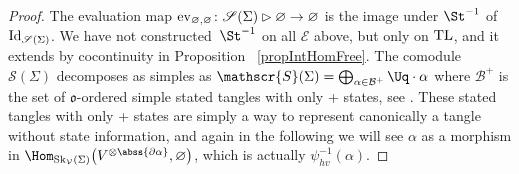 \begin{proof}
The evaluation map ${\rm ev}_{\varnothing,\varnothing}\colon \mathscr{S}(\Sigma)\rhd \varnothing\to\varnothing$ is the image under $\St^{-1}$ of ${\rm Id}_{\mathscr{S}(\Sigma)}$. We have not constructed~$\St^{-1}$ on all $\mathcal{E}$ above, but only on ${\rm TL}$, and it extends by cocontinuity in Proposition~ \ref{propIntHomFree}. The comodule~$\mathscr{S}(\Sigma)$ decomposes as simples as $\mathscr{S}(\Sigma) = \bigoplus_{\alpha \in \mathcal{B}^+} \Uq\cdot \alpha$ where $\mathcal{B}^+$ is the set of $\mathfrak{o}$-ordered simple stated tangles with only + states, see \cite[Theorem~4.6(b)]{Cos}. These stated tangles with only + states are simply a way to represent canonically a tangle without state information, and again in the following we will see $\alpha$ as a morphism in $\Hom_{{\rm Sk}_\mathcal{V}(\Sigma)}\big(V^{\otimes \abss{\partial \alpha}},\varnothing\big)$, which is actually $\psi_{hv}^{-1}(\alpha)$.


\end{proof}
